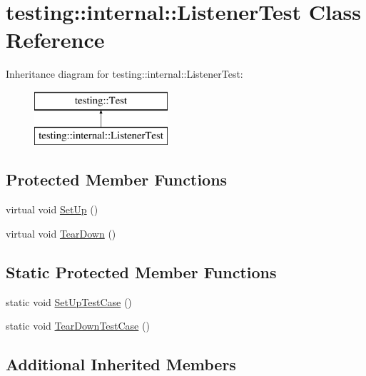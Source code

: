 \hypertarget{classtesting_1_1internal_1_1_listener_test}{}\section{testing\+:\+:internal\+:\+:Listener\+Test Class Reference}
\label{classtesting_1_1internal_1_1_listener_test}
Inheritance diagram for testing\+:\+:internal\+:\+:Listener\+Test\+:\begin{figure}[H]
\begin{center}
\leavevmode
\includegraphics[height=2.000000cm]{classtesting_1_1internal_1_1_listener_test}
\end{center}
\end{figure}
\subsection*{Protected Member Functions}
\begin{DoxyCompactItemize}
\item 
virtual void \hyperlink{classtesting_1_1internal_1_1_listener_test_ace3dbe36b705ddf320518e6cdd919bc8}{Set\+Up} ()
\item 
virtual void \hyperlink{classtesting_1_1internal_1_1_listener_test_ad112535025d668e3ea14e71d8741c810}{Tear\+Down} ()
\end{DoxyCompactItemize}
\subsection*{Static Protected Member Functions}
\begin{DoxyCompactItemize}
\item 
static void \hyperlink{classtesting_1_1internal_1_1_listener_test_a7cbc298576e584b4021d0375204b7391}{Set\+Up\+Test\+Case} ()
\item 
static void \hyperlink{classtesting_1_1internal_1_1_listener_test_aa35b5f1c6235f0fe98aa2c7f35bb8fe1}{Tear\+Down\+Test\+Case} ()
\end{DoxyCompactItemize}
\subsection*{Additional Inherited Members}


